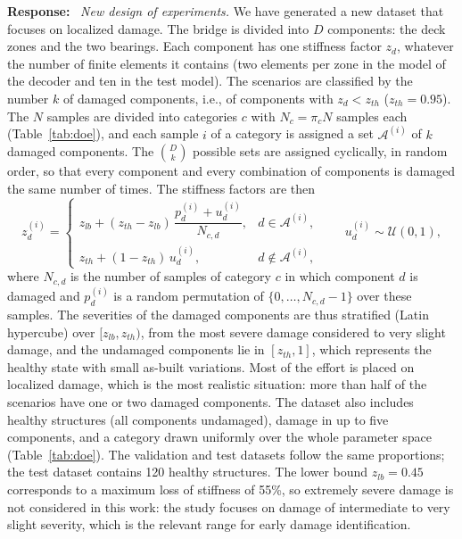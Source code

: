 \documentclass[11pt]{article}
\newenvironment{response}{\par\smallskip\noindent\color{resp}\textbf{Response:}\ }{\par}
\begin{document}
\begin{response}
\textit{New design of experiments.} We have generated a new dataset that focuses on localized damage. The bridge is
divided into $D$ components: the deck zones and the two bearings. Each component has one stiffness factor $z_d$,
whatever the number of finite elements it contains (two elements per zone in the model of the decoder and ten in the test
model). The scenarios are classified by the number $k$ of damaged components, i.e., of components with $z_d<z_{th}$
($z_{th}=0.95$). The $N$ samples are divided into categories $c$ with $N_c=\pi_c N$ samples each (Table~\ref{tab:doe}),
and each sample $i$ of a category is assigned a set $\mathcal{A}^{(i)}$ of $k$ damaged components. The
$\binom{D}{k}$ possible sets are assigned cyclically, in random order, so that every component and every combination of
components is damaged the same number of times. The stiffness factors are then
\begin{equation}
z_d^{(i)}=
\begin{cases}
z_{lb}+(z_{th}-z_{lb})\,\dfrac{p_d^{(i)}+u_d^{(i)}}{N_{c,d}}, & d\in\mathcal{A}^{(i)},\\[2ex]
z_{th}+(1-z_{th})\,u_d^{(i)}, & d\notin\mathcal{A}^{(i)},
\end{cases}
\qquad u_d^{(i)}\sim\mathcal{U}(0,1),
\label{eq:doe}
\end{equation}
where $N_{c,d}$ is the number of samples of category $c$ in which component $d$ is damaged and $p_d^{(i)}$ is a random
permutation of $\{0,\dots,N_{c,d}-1\}$ over these samples. The severities of the damaged components are thus stratified
(Latin hypercube) over $[z_{lb},z_{th})$, from the most severe damage considered to very slight damage, and the
undamaged components lie in $[z_{th},1]$, which represents the healthy state with small as-built variations. Most of the
effort is placed on localized damage, which is the most realistic situation: more than half of the scenarios have one or
two damaged components. The dataset also includes healthy structures (all components undamaged), damage in up to five
components, and a category drawn uniformly over the whole parameter space (Table~\ref{tab:doe}). The validation and test
datasets follow the same proportions; the test dataset contains 120 healthy structures. The lower bound $z_{lb}=0.45$
corresponds to a maximum loss of stiffness of 55\%, so extremely severe damage is not considered in this work: the study
focuses on damage of intermediate to very slight severity, which is the relevant range for early damage identification.


\end{response}
\end{document}
